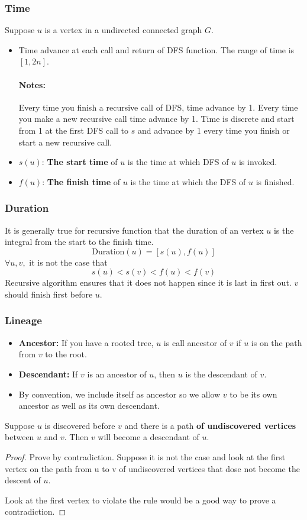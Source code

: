 \documentclass[en,hazy,blue,screen,14pt]{elegantnote}
\begin{document}
\subsubsection{Time}
Suppose $u$ is a vertex in a undirected connected graph $G$.
\begin{itemize}
\item Time advance at each call and return of DFS function. The range of time 
is $[1, 2n]$.
\paragraph{Notes:} Every time you finish a recursive call of DFS, time advance 
by 1. Every time you make a new recursive call time advance by 1. Time is 
discrete and start from 1 at the first DFS call to $s$ and advance by 1 every 
time you finish or start a new recursive call.
\item $s(u)$: \textbf{The start time} of $u$ is the time at which DFS of $u$ is 
invoked.
\item $f(u)$: \textbf{The finish time} of $u$ is the time at which the DFS of 
$u$ is finished.
\end{itemize}
\subsubsection{Duration}
It is generally true for recursive function that the duration of an vertex $u$ 
is the integral from the start to the finish time.
\[\text{Duration}(u) = [s(u), f(u)]\]
$\forall u, v,$ it is not the case that 
\[s(u) < s(v) < f(u) < f(v)\]
Recursive algorithm ensures that it does not happen since it is last in first 
out. $v$ should finish first before $u$.

\subsubsection{Lineage}
\begin{itemize}
\item \textbf{Ancestor:} If you have a rooted tree, $u$ is call ancestor of 
$v$ if $u$ is on the path from $v$ to the root. 
\item \textbf{Descendant:} If $v$ is an ancestor of $u$, then $u$ is the 
descendant of $v$.
\item By convention, we include itself as ancestor so we allow $v$ to be its 
own ancestor as well as its own descendant.
\end{itemize}
\begin{theorem}
Suppose $u$ is discovered before $v$ and there is a path \textbf{of 
undiscovered vertices} between $u$ and $v$. Then $v$ will become a descendant 
of $u$.
\end{theorem}
\begin{proof}
Prove by contradiction. Suppose it is not the case and look at the first 
vertex on the path from u to v of undiscovered vertices that dose not become 
the descent of $u$.

Look at the first vertex to violate the rule would be a good way to prove a 
contradiction.
\end{proof}
\end{document}
